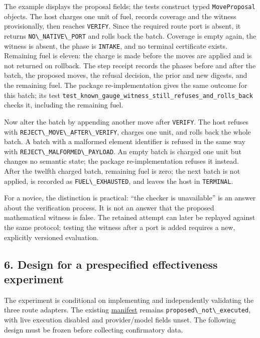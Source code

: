 \documentclass[
  11pt,
]{article}
\newcommand{\passthrough}[1]{#1}
\begin{document}
The example displays the proposal fields; the tests construct typed
\passthrough{\lstinline!MoveProposal!} objects. The host charges one
unit of fuel, records coverage and the witness provisionally, then
reaches \passthrough{\lstinline!VERIFY!}. Since the required route port
is absent, it returns \passthrough{\lstinline!NO\_NATIVE\_PORT!} and
rolls back the batch. Coverage is empty again, the witness is absent,
the phase is \passthrough{\lstinline!INTAKE!}, and no terminal
certificate exists. Remaining fuel is eleven: the charge is made before
the moves are applied and is not returned on rollback. The step receipt
records the phases before and after the batch, the proposed moves, the
refusal decision, the prior and new digests, and the remaining fuel. The
package re-implementation gives the same outcome for this batch; its
test \nolinkurl{test_known_gauge_witness_still_refuses_and_rolls_back}
checks it, including the remaining fuel.

Now alter the batch by appending another move after
\passthrough{\lstinline!VERIFY!}. The host refuses with
\passthrough{\lstinline!REJECT\_MOVE\_AFTER\_VERIFY!}, charges one unit,
and rolls back the whole batch. A batch with a malformed element
identifier is refused in the same way with
\passthrough{\lstinline!REJECT\_MALFORMED\_PAYLOAD!}. An empty batch is
charged one unit but changes no semantic state; the package
re-implementation refuses it instead. After the twelfth charged batch,
remaining fuel is zero; the next batch is not applied, is recorded as
\passthrough{\lstinline!FUEL\_EXHAUSTED!}, and leaves the host in
\passthrough{\lstinline!TERMINAL!}.

For a novice, the distinction is practical: ``the checker is
unavailable'' is an answer about the verification process. It is not an
answer that the proposed mathematical witness is false. The retained
attempt can later be replayed against the same protocol; testing the
witness after a port is added requires a new, explicitly versioned
evaluation.

\subsection{6. Design for a prespecified effectiveness
experiment}\label{design-for-a-prespecified-effectiveness-experiment}

The experiment is conditional on implementing and independently
validating the three route adapters. The existing
\href{https://github.com/dbccpage/the_symbol_game/blob/52cb5457f6c485ba548cfd292f6012a941ed22cf/atlas/coda_atlas/symbol_game/003_pfp_host_admitted_failure_detectors/demos/demo_3/experiment_manifest.yaml}{manifest}
remains \passthrough{\lstinline!proposed\_not\_executed!}, with live
execution disabled and provider/model fields unset. The following design
must be frozen before collecting confirmatory data.
\end{document}
